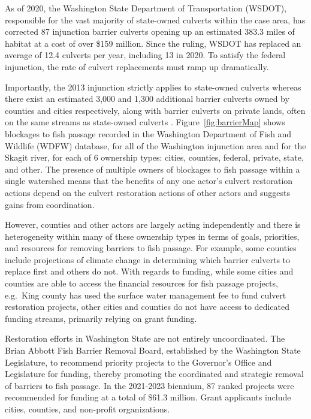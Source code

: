 \documentclass[12pt]{elsarticle}
\begin{document}
As of 2020, the Washington State Department of Transportation (WSDOT), responsible for the vast majority of state-owned culverts within the case area, has corrected 87 injunction barrier culverts opening up an estimated 383.3 miles of habitat at a cost of over \$159 million. Since the ruling, WSDOT has replaced an average of 12.4 culverts per year, including 13 in 2020. To satisfy the federal injunction, the rate of culvert replacements must ramp up dramatically. 

Importantly, the 2013 injunction strictly applies to state-owned culverts whereas there exist an estimated 3,000 and 1,300 additional barrier culverts owned by counties and cities respectively, along with barrier culverts on private lands, often on the same streams as state-owned culverts \citep{brown2019coming}. Figure~\ref{fig:barrierMap} shows blockages to fish passage recorded in the Washington Department of Fish and Wildlife (WDFW) database, for all of the Washington injunction area and for the Skagit river, for each of 6 ownership types: cities, counties, federal, private, state, and other. The presence of multiple owners of blockages to fish passage within a single watershed means that the benefits of any one actor's culvert restoration actions depend on the culvert restoration actions of other actors and suggests gains from coordination. 

However, counties and other actors are largely acting independently and there is heterogeneity within many of these ownership types in terms of goals, priorities, and resources for removing barriers to fish passage. For example, some counties include projections of climate change in determining which barrier culverts to replace first and others do not. With regards to funding, while some cities and counties are able to access the financial resources for fish passage projects, e.g.\ King county has used the surface water management fee to fund culvert restoration projects, other cities and counties do not have access to dedicated funding streams, primarily relying on grant funding.  

Restoration efforts in Washington State are not entirely uncoordinated. The Brian Abbott Fish Barrier Removal Board, established by the Washington State Legislature, to recommend priority projects to the Governor's Office and Legislature for funding, thereby promoting the coordinated and strategic removal of barriers to fish passage. In the 2021-2023 biennium, 87 ranked projects were recommended for funding at a total of \$61.3 million. Grant applicants include cities, counties, and non-profit organizations.
\end{document}
